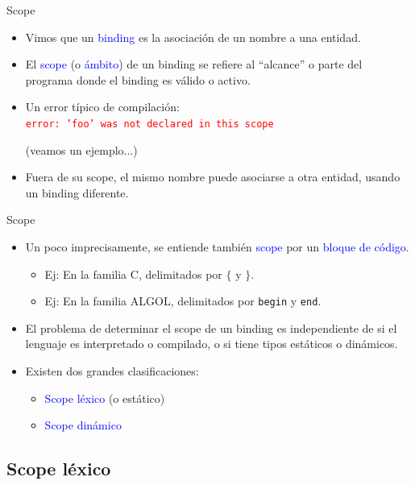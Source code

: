 \documentclass{beamer} %
\newcommand{\blue}[1]{\textcolor{blue}{#1}}
\newcommand{\red}[1]{\textcolor{red}{#1}}
\begin{document}
\begin{frame}{Scope}
    \begin{itemize}
        \item<1-> Vimos que un \blue{binding} es la asociación de un nombre a una entidad.
        \item<2-> El \blue{scope} (o \blue{ámbito}) de un binding se refiere al ``alcance'' o parte del programa donde el binding es válido o activo.
        \item<3-> Un error típico de compilación:\\
        \red{\texttt{error: 'foo' was not declared in this scope}}
        \begin{flushright}
           {\small (veamos un ejemplo...)}
        \end{flushright}
        \item<4-> Fuera de su scope, el mismo nombre puede asociarse a otra entidad, usando un binding diferente.
    \end{itemize}
\end{frame}

\begin{frame}{Scope}
    \begin{itemize}
        \item<1-> Un poco imprecisamente, se entiende también \blue{scope} por un \blue{bloque de código}.
        \begin{itemize}
            \item Ej: En la familia C, delimitados por \texttt{$\{$} y \texttt{$\}$}.
            \item Ej: En la familia ALGOL, delimitados por \texttt{begin} y \texttt{end}.
        \end{itemize}
        \item<2-> El problema de determinar el scope de un binding es independiente de si el lenguaje es interpretado o compilado, o si tiene tipos estáticos o dinámicos.
        \item<3-> Existen dos grandes clasificaciones:
        \begin{itemize}
            \item \blue{Scope léxico} (o estático)
            \item \blue{Scope dinámico}
        \end{itemize}
    \end{itemize}
\end{frame}

\subsection{Scope léxico}
\end{document}
